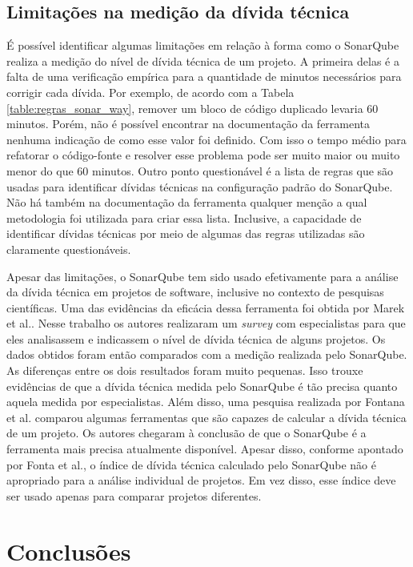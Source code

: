 \subsection{Limitações na medição da dívida técnica}


É possível identificar algumas limitações em relação à forma como o SonarQube realiza a medição do nível de dívida técnica de um projeto. A primeira delas é a falta de uma verificação empírica para a quantidade de minutos necessários para corrigir cada dívida. Por exemplo, de acordo com a Tabela \ref{table:regras_sonar_way}, remover um bloco de código duplicado levaria 60 minutos. Porém, não é possível encontrar na documentação da ferramenta nenhuma indicação de como esse valor foi definido. Com isso o tempo médio para refatorar o código-fonte e resolver esse problema pode ser muito maior ou muito menor do que 60 minutos. Outro ponto questionável é a lista de regras que são usadas para identificar dívidas técnicas na configuração padrão do SonarQube. Não há também na documentação da ferramenta qualquer menção a qual metodologia foi utilizada para criar essa lista. Inclusive, a capacidade de identificar dívidas técnicas por meio de algumas das regras utilizadas são claramente questionáveis. 

Apesar das limitações, o SonarQube tem sido usado efetivamente para a análise da dívida técnica em projetos de software, inclusive no contexto de pesquisas científicas. Uma das evidências da eficácia dessa ferramenta foi obtida por Marek et al.\cite{stochel2012value}. Nesse trabalho os autores realizaram um \textit{survey} com especialistas para que eles analisassem e indicassem o nível de dívida técnica de alguns projetos. Os dados obtidos foram então comparados com a medição realizada pelo SonarQube. As diferenças entre os dois resultados foram muito pequenas. Isso trouxe evidências de que a dívida técnica medida pelo SonarQube é tão precisa quanto aquela medida por especialistas.  Além disso, uma pesquisa realizada por Fontana et al.\cite{fontana2016tool} comparou algumas ferramentas que são capazes de calcular a dívida técnica de um projeto. Os autores chegaram à conclusão de que o SonarQube é a ferramenta mais precisa atualmente disponível. Apesar disso, conforme apontado por Fonta et al.\cite{fontana2016technical}, o índice de dívida técnica calculado pelo SonarQube não é apropriado para a análise individual de projetos. Em vez disso, esse índice deve ser usado apenas para comparar projetos diferentes.  


\section{Conclusões}

